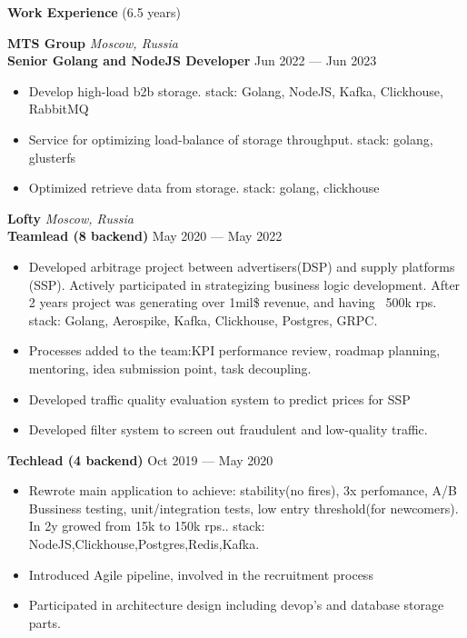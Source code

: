 \documentclass{resume} %
\begin{document}
\begin{rSection}{\textbf{Work Experience} (6.5 years) }

\textbf{MTS Group} \hfill \textit{Moscow, Russia} \\
\textbf{Senior Golang and NodeJS Developer}  \hfill Jun 2022 --- Jun 2023
\begin{itemize}
    \setlength\itemsep{-0.3em}
    \item Develop high-load b2b storage. stack: Golang, NodeJS, Kafka, Clickhouse, RabbitMQ
    \item Service for optimizing load-balance of storage throughput. stack: golang, glusterfs
    \item Optimized retrieve data from storage. stack: golang, clickhouse
\end{itemize}

\textbf{Lofty} \hfill \textit{Moscow, Russia} \\
\textbf{Teamlead (8 backend)} \hfill May 2020 --- May 2022
\begin{itemize}
    \setlength\itemsep{-0.3em}
    \item Developed arbitrage project between advertisers(DSP) and supply platforms (SSP). Actively participated in strategizing
    	   business logic development.
    	   After 2 years project was generating over 1mil\$ revenue, and having ~500k rps.
	    \\ stack: Golang, Aerospike, Kafka, Clickhouse, Postgres, GRPC.
    \item Processes added to the team:KPI performance review, roadmap planning, mentoring, idea submission point, task decoupling.
    \item Developed traffic quality evaluation system to predict prices for SSP
    \item Developed filter system to screen out fraudulent and low-quality traffic.
\end{itemize}

\textbf{Techlead (4 backend)} \hfill Oct 2019 --- May 2020
\begin{itemize}
    \setlength\itemsep{-0.3em}
    \item Rewrote main application to achieve: stability(no fires), 3x perfomance, A/B Bussiness testing, unit/integration tests, low
    	    entry threshold(for newcomers).
    	    In 2y growed from 15k to 150k rps.. stack: NodeJS,Clickhouse,Postgres,Redis,Kafka.
    \item Introduced Agile pipeline, involved in the recruitment process
    \item Participated in architecture design including devop's and database storage parts.
\end{itemize}


\end{rSection}
\end{document}
